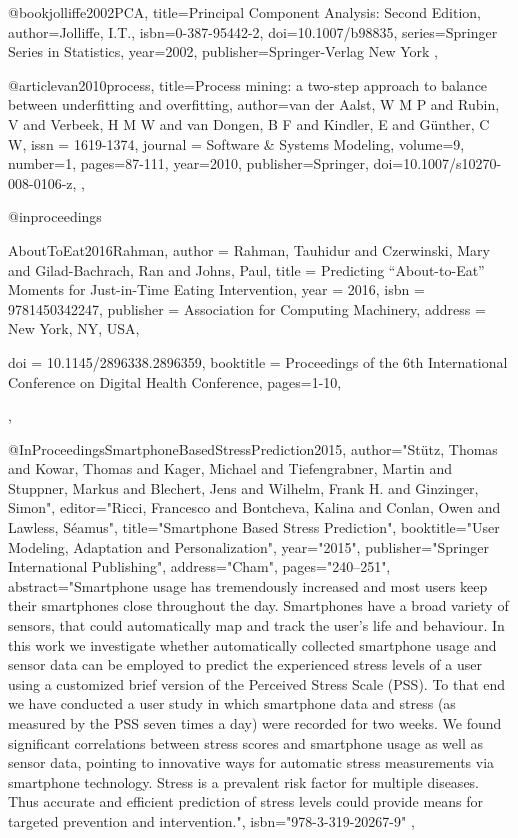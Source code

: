 @book{jolliffe2002PCA,
  title={Principal Component Analysis: Second Edition},
  author={Jolliffe, I.T.},
  isbn={0-387-95442-2},
  doi={10.1007/b98835},
  series={Springer Series in Statistics},
  year={2002},
  publisher={Springer-Verlag New York}
},

@article{van2010process,
  title={Process mining: a two-step approach to balance between underfitting and overfitting},
  author={van der Aalst, W M P and Rubin, V and Verbeek, H M W and van Dongen, B F and Kindler, E and G{\"{u}}nther, C W},
  issn = {1619-1374},
journal = {Software {\&} Systems Modeling},
  volume={9},
  number={1},
  pages={87-111},
  year={2010},
  publisher={Springer},
  doi={10.1007/s10270-008-0106-z},
},


@inproceedings{AboutToEat2016Rahman, 
author = {Rahman, Tauhidur and Czerwinski, Mary and Gilad-Bachrach, Ran and Johns, Paul}, 
title = {Predicting \enquote{About-to-Eat} Moments for Just-in-Time Eating Intervention}, 
year = {2016}, 
isbn = {9781450342247}, 
publisher = {Association for Computing Machinery}, 
address = {New York, NY, USA}, 

doi = {10.1145/2896338.2896359}, 
booktitle = {Proceedings of the 6th International Conference on Digital Health Conference},
pages={1-10},
},

@InProceedings{SmartphoneBasedStressPrediction2015,
author="St{\"u}tz, Thomas
and Kowar, Thomas
and Kager, Michael
and Tiefengrabner, Martin
and Stuppner, Markus
and Blechert, Jens
and Wilhelm, Frank H.
and Ginzinger, Simon",
editor="Ricci, Francesco
and Bontcheva, Kalina
and Conlan, Owen
and Lawless, S{\'e}amus",
title="Smartphone Based Stress Prediction",
booktitle="User Modeling, Adaptation and Personalization",
year="2015",
publisher="Springer International Publishing",
address="Cham",
pages="240--251",
abstract="Smartphone usage has tremendously increased and most users keep their smartphones close throughout the day. Smartphones have a broad variety of sensors, that could automatically map and track the user's life and behaviour. In this work we investigate whether automatically collected smartphone usage and sensor data can be employed to predict the experienced stress levels of a user using a customized brief version of the Perceived Stress Scale (PSS). To that end we have conducted a user study in which smartphone data and stress (as measured by the PSS seven times a day) were recorded for two weeks. We found significant correlations between stress scores and smartphone usage as well as sensor data, pointing to innovative ways for automatic stress measurements via smartphone technology. Stress is a prevalent risk factor for multiple diseases. Thus accurate and efficient prediction of stress levels could provide means for targeted prevention and intervention.",
isbn="978-3-319-20267-9"
},

